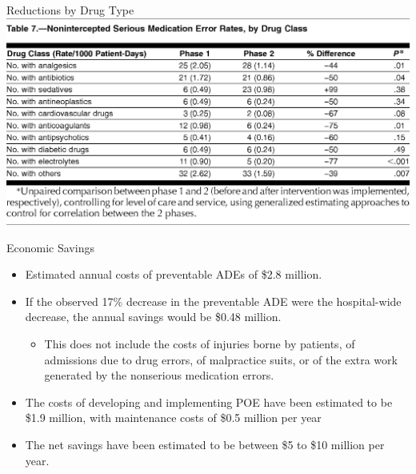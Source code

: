 \documentclass[10pt]{beamer}
\begin{document}
\begin{frame}{Reductions by Drug Type}
	\includegraphics[width=1\textwidth]{images/jama7.png}
\end{frame}

\begin{frame}{Economic Savings}
	\begin{itemize}
		\item Estimated annual costs of preventable ADEs of \$2.8 million. 
		\item If the observed 17\% decrease in the preventable ADE were the hospital-wide decrease, the annual savings would be \$0.48 million. 
		\begin{itemize}
			\item This does not include the costs of injuries borne by patients, of admissions due to drug errors, of malpractice suits, or of the extra work generated by the nonserious medication errors. 
		\end{itemize}
		\item The costs of developing and implementing POE have been estimated to be \$1.9 million, with maintenance costs of \$0.5 million per year
		\item The net savings have been estimated to be between \$5 to \$10 million per year.
	\end{itemize}
\end{frame}
\end{document}
